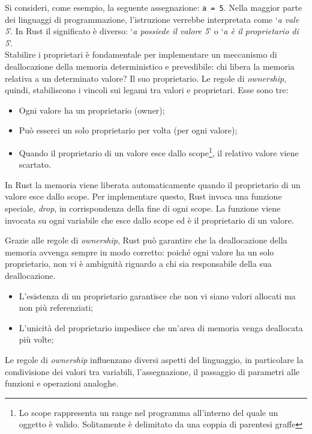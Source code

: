 Si consideri, come esempio, la seguente assegnazione: \texttt{a = 5}.
Nella maggior parte dei linguaggi di programmazione, l'istruzione verrebbe interpretata come `\textit{a vale 5}'. In Rust il significato è diverso: `\textit{a possiede il valore 5}' o `\textit{a è il proprietario di 5}'. \\
\indent Stabilire i proprietari è fondamentale per implementare un meccanismo di deallocazione della memoria deterministico e prevedibile: chi libera la memoria relativa a un determinato valore? Il suo proprietario. \hfill
\noindent Le regole di \textit{ownership}, quindi, stabiliscono i vincoli sui legami tra valori e proprietari. Esse sono tre:
\begin{itemize}
    \item Ogni valore ha un proprietario (owner);
    \item Può esserci un solo proprietario per volta (per ogni valore);
    \item Quando il proprietario di un valore esce dallo scope\footnote{Lo scope rappresenta un range nel programma all'interno del quale un oggetto è valido. Solitamente è delimitato da una coppia di parentesi graffe}, il relativo valore viene scartato.
\end{itemize}

\noindent In Rust la memoria viene liberata automaticamente quando il proprietario di un valore esce dallo scope. Per implementare questo, Rust invoca una funzione speciale, \textit{drop}, in corrispondenza della fine di ogni scope. La funzione viene invocata su ogni variabile che esce dallo scope ed è il proprietario di un valore.

Grazie alle regole di \textit{ownership}, Rust può garantire che la deallocazione della memoria avvenga sempre in modo corretto: poiché ogni valore ha un solo proprietario, non vi è ambiguità riguardo a chi sia responsabile della sua deallocazione.
\begin{itemize}
    \item L'esistenza di un proprietario garantisce che non vi siano valori allocati ma non più referenziati;
    \item L'unicità del proprietario impedisce che un'area di memoria venga deallocata più volte;
\end{itemize}

\noindent Le regole di \textit{ownership} influenzano diversi aspetti del linguaggio, in particolare la condivisione dei valori tra variabili, l'assegnazione, il passaggio di parametri alle funzioni e operazioni analoghe.

